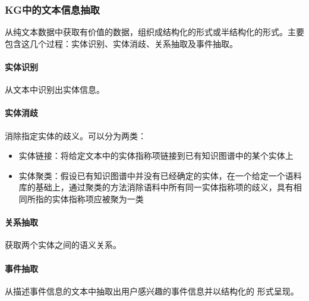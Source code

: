 \subsubsection{KG中的文本信息抽取}
从纯文本数据中获取有价值的数据，组织成结构化的形式或半结构化的形式。主要包含这几个过程：实体识别、实体消歧、关系抽取及事件抽取。
\paragraph{实体识别}从文本中识别出实体信息。

\paragraph{实体消歧}消除指定实体的歧义。可以分为两类：
\begin{itemize}
	\item 实体链接：将给定文本中的实体指称项链接到已有知识图谱中的某个实体上
	\item 实体聚类：假设已有知识图谱中并没有已经确定的实体，在一个给定一个语料库的基础上，通过聚类的方法消除语料中所有同一实体指称项的歧义，具有相同所指的实体指称项应被聚为一类
\end{itemize}

\paragraph{关系抽取}获取两个实体之间的语义关系。

\paragraph{事件抽取}从描述事件信息的文本中抽取出用户感兴趣的事件信息并以结构化的
形式呈现。
